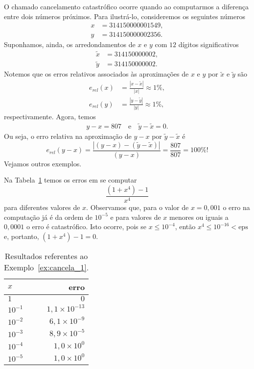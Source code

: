 O chamado cancelamento catastrófico ocorre quando ao computarmos a diferença entre dois números próximos. Para ilustrá-lo, consideremos os seguintes números
\begin{align}
  x &= 314150000001549,\\
  y &= 314150000002356.
\end{align}
Suponhamos, ainda, os arredondamentos de $x$ e $y$ com $12$ dígitos significativos
\begin{align}
  \tilde{x} &= 314150000002,\\
  \tilde{y} &= 314150000002.
\end{align}
Notemos que os erros relativos associados às aproximações de $x$ e $y$ por $\tilde{x}$ e $\tilde{y}$ são
\begin{align}
  e_{rel}(x) &= \frac{|x-\tilde{x}|}{|x|} \approx 1\%,\\
  e_{rel}(y) &= \frac{|y-\tilde{y}|}{|y|} \approx 1\%,
\end{align}
respectivamente. Agora, temos
\begin{align}
  y-x = 807\quad\text{e}\quad\tilde{y}-\tilde{x}=0.
\end{align}
Ou seja, o erro relativa na aproximação de $y-x$ por $\tilde{y}-\tilde{x}$ é
\begin{equation}
  e_{rel}(y-x) = \frac{|(y-x)-(\tilde{y}-\tilde{x})|}{(y-x)} = \frac{807}{807} = 100\%!
\end{equation}
Vejamos outros exemplos.

\begin{ex}\label{ex:cancela_1}
  Na Tabela~\ref{tab:cancela_1} temos os erros em se computar
  \begin{equation}
    \frac{(1+x^4)-1}{x^4}
  \end{equation}
para diferentes valores de $x$. Observamos que, para o valor de $x=0,001$ o erro na computação já é da ordem de $10^{-5}$ e para valores de $x$ menores ou iguais a $0,0001$ o erro é catastrófico. Isto ocorre, pois se $x\leq 10^{-4}$, então $x^4 \leq 10^{-16} < \mathrm{eps}$ e, portanto, $(1+x^4)-1=0$.
  \begin{table}[h!]
    \centering
    \begin{tabular}{l|r}
      $x$     & erro \\\hline
      $1$      & $0$ \\
      $10^{-1}$ & $1,1\times 10^{-13}$\\
      $10^{-2}$ & $6,1\times 10^{-9}$\\
      $10^{-3}$ & $8,9\times 10^{-5}$\\
      $10^{-4}$ & $1,0\times 10^{0}$\\
      $10^{-5}$ & $1,0\times 10^{0}$\\\hline
    \end{tabular}
    \caption{Resultados referentes ao Exemplo~\ref{ex:cancela_1}.}
    \label{tab:cancela_1}
  \end{table}
\end{ex}

